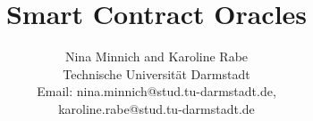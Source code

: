 \documentclass[conference]{IEEEtran}
\begin{document}
%
\title{Smart Contract Oracles}


\author{Nina Minnich and Karoline Rabe \\ Technische Universit{\"a}t Darmstadt \\ Email: nina.minnich@stud.tu-darmstadt.de, \\ karoline.rabe@stud.tu-darmstadt.de}


% 









\maketitle
\end{document}
